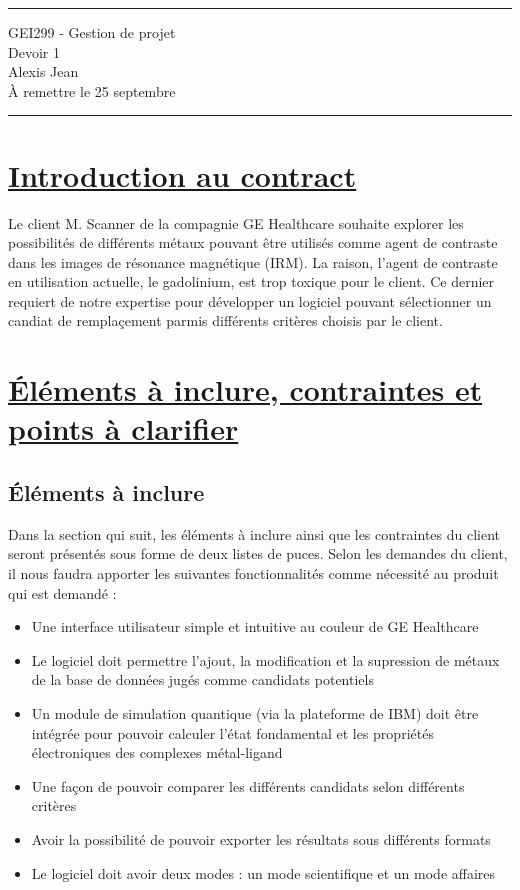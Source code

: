 \documentclass[11pt]{article}
\begin{document}
\hrule

\begin{center}
  {\Large GEI299 - Gestion de projet} \\ \vspace{5mm}
  {\LARGE\sffamily Devoir 1} \\
  Alexis Jean \\
  À remettre le 25 septembre
\end{center}

\hrule


\section{\underline{Introduction au contract}}
Le client M. Scanner de la compagnie GE Healthcare souhaite explorer les possibilités de différents métaux pouvant être utilisés comme agent de contraste dans les images de résonance magnétique (IRM). La raison, l'agent de contraste en utilisation actuelle, le gadolinium, est trop toxique pour le client. Ce dernier requiert de notre expertise pour développer un logiciel pouvant sélectionner un candiat de remplaçement parmis différents critères choisis par le client.


\section{\underline{Éléments à inclure, contraintes et points à clarifier}}

\subsection{Éléments à inclure}
Dans la section qui suit, les éléments à inclure ainsi que les contraintes du client seront présentés sous forme de deux listes de puces. Selon les demandes du client, il nous faudra apporter les suivantes fonctionnalités comme nécessité au produit qui est demandé :

\begin{itemize}[label=\textbullet]
  \item Une interface utilisateur simple et intuitive au couleur de GE Healthcare
  \item Le logiciel doit permettre l'ajout, la modification et la supression de métaux de la base de données jugés comme candidats potentiels
  \item Un module de simulation quantique (via la plateforme de IBM) doit être intégrée pour pouvoir calculer l’état fondamental et les propriétés électroniques des complexes métal-ligand
  \item Une façon de pouvoir comparer les différents candidats selon différents critères
  \item Avoir la possibilité de pouvoir exporter les résultats sous différents formats
  \item Le logiciel doit avoir deux modes : un mode scientifique et un mode affaires
\end{itemize}
\end{document}
